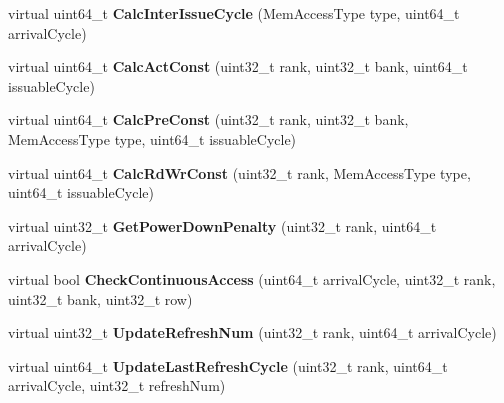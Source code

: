 \begin{DoxyCompactItemize}
\item 
\hypertarget{classMemChannelBase_a004618cbad63872b77f73fb46507ae88}{virtual uint64\-\_\-t {\bfseries Calc\-Inter\-Issue\-Cycle} (Mem\-Access\-Type type, uint64\-\_\-t arrival\-Cycle)}\label{classMemChannelBase_a004618cbad63872b77f73fb46507ae88}

\item 
\hypertarget{classMemChannelBase_a9808754c103a7cb6700d19176db56826}{virtual uint64\-\_\-t {\bfseries Calc\-Act\-Const} (uint32\-\_\-t rank, uint32\-\_\-t bank, uint64\-\_\-t issuable\-Cycle)}\label{classMemChannelBase_a9808754c103a7cb6700d19176db56826}

\item 
\hypertarget{classMemChannelBase_aa3596a5a18c951ca3df722459589e7bd}{virtual uint64\-\_\-t {\bfseries Calc\-Pre\-Const} (uint32\-\_\-t rank, uint32\-\_\-t bank, Mem\-Access\-Type type, uint64\-\_\-t issuable\-Cycle)}\label{classMemChannelBase_aa3596a5a18c951ca3df722459589e7bd}

\item 
\hypertarget{classMemChannelBase_aabd0c4decaa154fca93cd7809cd5eae5}{virtual uint64\-\_\-t {\bfseries Calc\-Rd\-Wr\-Const} (uint32\-\_\-t rank, Mem\-Access\-Type type, uint64\-\_\-t issuable\-Cycle)}\label{classMemChannelBase_aabd0c4decaa154fca93cd7809cd5eae5}

\item 
\hypertarget{classMemChannelBase_a94f245dd5873c65df9b97901a7339e1f}{virtual uint32\-\_\-t {\bfseries Get\-Power\-Down\-Penalty} (uint32\-\_\-t rank, uint64\-\_\-t arrival\-Cycle)}\label{classMemChannelBase_a94f245dd5873c65df9b97901a7339e1f}

\item 
\hypertarget{classMemChannelBase_a3e58cb7900f1ee33c067f09285ef8e81}{virtual bool {\bfseries Check\-Continuous\-Access} (uint64\-\_\-t arrival\-Cycle, uint32\-\_\-t rank, uint32\-\_\-t bank, uint32\-\_\-t row)}\label{classMemChannelBase_a3e58cb7900f1ee33c067f09285ef8e81}

\item 
\hypertarget{classMemChannelBase_a37ab3d2cd2ed625d6b95f5735454ac6f}{virtual uint32\-\_\-t {\bfseries Update\-Refresh\-Num} (uint32\-\_\-t rank, uint64\-\_\-t arrival\-Cycle)}\label{classMemChannelBase_a37ab3d2cd2ed625d6b95f5735454ac6f}

\item 
\hypertarget{classMemChannelBase_acdb7483ec52037516065b9857359ad3d}{virtual uint64\-\_\-t {\bfseries Update\-Last\-Refresh\-Cycle} (uint32\-\_\-t rank, uint64\-\_\-t arrival\-Cycle, uint32\-\_\-t refresh\-Num)}\label{classMemChannelBase_acdb7483ec52037516065b9857359ad3d}


\end{DoxyCompactItemize}
